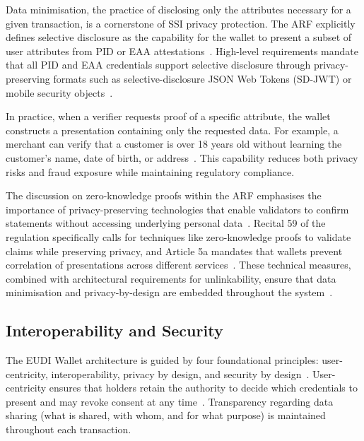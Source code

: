 \documentclass[sigconf,balance,nonacm,authordraft]{acmart}
\begin{document}
Data minimisation, the practice of disclosing only the attributes necessary for a given transaction, is a cornerstone of SSI privacy protection. The ARF explicitly defines selective disclosure as the capability for the wallet to present a subset of user attributes from PID or EAA attestations~\cite{ARF_SelectDisclosureDefinition}. High-level requirements mandate that all PID and EAA credentials support selective disclosure through privacy-preserving formats such as selective-disclosure JSON Web Tokens (SD-JWT) or mobile security objects~\cite{ARF_AttestationSelectiveDisclosure}.

In practice, when a verifier requests proof of a specific attribute, the wallet constructs a presentation containing only the requested data. For example, a merchant can verify that a customer is over 18 years old without learning the customer's name, date of birth, or address~\cite{ISC2_SelectDisclosureExample,DocuSign_SelectDisclosure}. This capability reduces both privacy risks and fraud exposure while maintaining regulatory compliance.

The discussion on zero-knowledge proofs within the ARF emphasises the importance of privacy-preserving technologies that enable validators to confirm statements without accessing underlying personal data~\cite{ZKPDiscussion_Recital59}. Recital 59 of the regulation specifically calls for techniques like zero-knowledge proofs to validate claims while preserving privacy, and Article 5a mandates that wallets prevent correlation of presentations across different services~\cite{ZKPDiscussion_Recital59,ZKPDiscussion_Article5a}. These technical measures, combined with architectural requirements for unlinkability, ensure that data minimisation and privacy-by-design are embedded throughout the system~\cite{Potential_PrivacyDesign}.

\subsection{Interoperability and Security}

The EUDI Wallet architecture is guided by four foundational principles: user-centricity, interoperability, privacy by design, and security by design~\cite{ISC2_GuidingPrinciples}. User-centricity ensures that holders retain the authority to decide which credentials to present and may revoke consent at any time~\cite{ISC2_ConsentRole,Potential_UserCentricity}. Transparency regarding data sharing (what is shared, with whom, and for what purpose) is maintained throughout each transaction.
\end{document}
